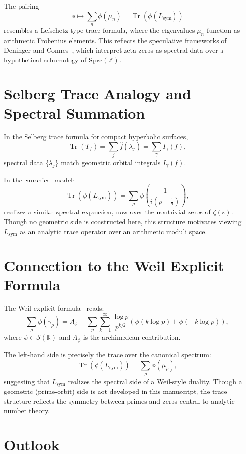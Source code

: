 The pairing
\[
\phi \mapsto \sum_n \phi(\mu_n) = \operatorname{Tr}(\phi(L_{\mathrm{sym}}))
\]
resembles a Lefschetz-type trace formula, where the eigenvalues \( \mu_n \) function as arithmetic Frobenius elements. This reflects the speculative frameworks of Deninger and Connes~\cite{Deninger1998Frobenius, Connes1999TraceFormula}, which interpret zeta zeros as spectral data over a hypothetical cohomology of \( \mathrm{Spec}(\mathbb{Z}) \).

\section*{Selberg Trace Analogy and Spectral Summation}

In the Selberg trace formula for compact hyperbolic surfaces,
\[
\operatorname{Tr}(T_f) = \sum_j \hat{f}(\lambda_j) = \sum_\gamma I_\gamma(f),
\]
spectral data \( \{\lambda_j\} \) match geometric orbital integrals \( I_\gamma(f) \).

In the canonical model:
\[
\operatorname{Tr}(\phi(L_{\mathrm{sym}})) = \sum_\rho \phi\left( \frac{1}{i(\rho - \tfrac{1}{2})} \right),
\]
realizes a similar spectral expansion, now over the nontrivial zeros of \( \zeta(s) \). Though no geometric side is constructed here, this structure motivates viewing \( L_{\mathrm{sym}} \) as an analytic trace operator over an arithmetic moduli space.

\section*{Connection to the Weil Explicit Formula}

The Weil explicit formula~\cite{Weil1952Explicite, Edwards1974Zeta} reads:
\[
\sum_\rho \phi(\gamma_\rho) = A_\phi + \sum_p \sum_{k=1}^\infty \frac{\log p}{p^{k/2}} \left( \phi(k \log p) + \phi(-k \log p) \right),
\]
where \( \phi \in \mathcal{S}(\mathbb{R}) \) and \( A_\phi \) is the archimedean contribution.

The left-hand side is precisely the trace over the canonical spectrum:
\[
\operatorname{Tr}(\phi(L_{\mathrm{sym}})) = \sum_\rho \phi(\mu_\rho),
\]
suggesting that \( L_{\mathrm{sym}} \) realizes the spectral side of a Weil-style duality. Though a geometric (prime-orbit) side is not developed in this manuscript, the trace structure reflects the symmetry between primes and zeros central to analytic number theory.

\section*{Outlook}

